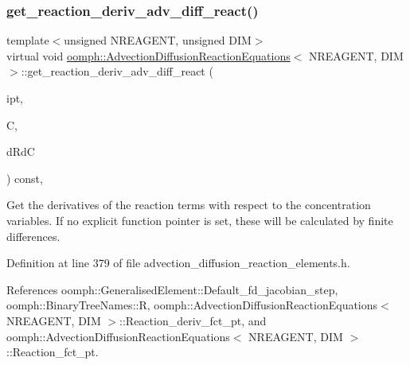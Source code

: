 \mbox{\label{classoomph_1_1AdvectionDiffusionReactionEquations_a14deb197bcb3ddb01798c98b2942f5d0}} 
\subsubsection{\texorpdfstring{get\+\_\+reaction\+\_\+deriv\+\_\+adv\+\_\+diff\+\_\+react()}{get\_reaction\_deriv\_adv\_diff\_react()}}
{\footnotesize\ttfamily template$<$unsigned N\+R\+E\+A\+G\+E\+NT, unsigned D\+IM$>$ \\
virtual void \hyperlink{classoomph_1_1AdvectionDiffusionReactionEquations}{oomph\+::\+Advection\+Diffusion\+Reaction\+Equations}$<$ N\+R\+E\+A\+G\+E\+NT, D\+IM $>$\+::get\+\_\+reaction\+\_\+deriv\+\_\+adv\+\_\+diff\+\_\+react (\begin{DoxyParamCaption}\item[{const unsigned \&}]{ipt,  }\item[{const \hyperlink{classoomph_1_1Vector}{Vector}$<$ double $>$ \&}]{C,  }\item[{\hyperlink{classoomph_1_1DenseMatrix}{Dense\+Matrix}$<$ double $>$ \&}]{d\+RdC }\end{DoxyParamCaption}) const\hspace{0.3cm}{\ttfamily [inline]}, {\ttfamily [virtual]}}



Get the derivatives of the reaction terms with respect to the concentration variables. If no explicit function pointer is set, these will be calculated by finite differences. 



Definition at line 379 of file advection\+\_\+diffusion\+\_\+reaction\+\_\+elements.\+h.



References oomph\+::\+Generalised\+Element\+::\+Default\+\_\+fd\+\_\+jacobian\+\_\+step, oomph\+::\+Binary\+Tree\+Names\+::R, oomph\+::\+Advection\+Diffusion\+Reaction\+Equations$<$ N\+R\+E\+A\+G\+E\+N\+T, D\+I\+M $>$\+::\+Reaction\+\_\+deriv\+\_\+fct\+\_\+pt, and oomph\+::\+Advection\+Diffusion\+Reaction\+Equations$<$ N\+R\+E\+A\+G\+E\+N\+T, D\+I\+M $>$\+::\+Reaction\+\_\+fct\+\_\+pt.

